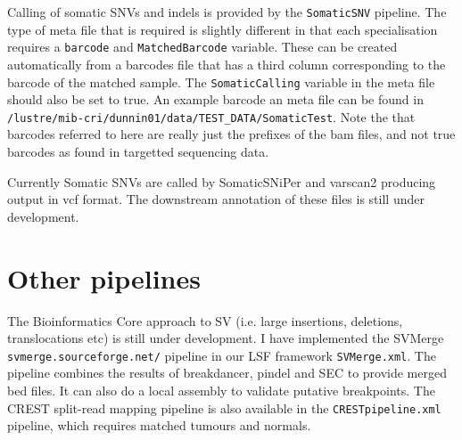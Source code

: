 \documentclass[a4paper,11pt]{article}
\begin{document}
Calling of somatic SNVs and indels is provided by the {\tt SomaticSNV} pipeline. The type of meta file that is required is slightly different in that each specialisation requires a {\tt barcode} and {\tt MatchedBarcode} variable. These can be created automatically from a barcodes file that has a third column corresponding to the barcode of the matched sample. The {\tt SomaticCalling} variable in the meta file should also be set to true. An example barcode an meta file can be found in {\tt /lustre/mib-cri/dunnin01/data/TEST\_DATA/SomaticTest}. Note the that barcodes referred to here are really just the prefixes of the bam files, and not true barcodes as found in targetted sequencing data.


Currently Somatic SNVs are called by SomaticSNiPer and varscan2 producing output in vcf format. The downstream annotation of these files is still under development.

\section{Other pipelines}

The Bioinformatics Core approach to SV (i.e. large insertions, deletions, translocations etc) is still under development. I have implemented the SVMerge {\tt svmerge.sourceforge.net/} pipeline in our LSF framework {\tt SVMerge.xml}. The pipeline combines the results of breakdancer, pindel and SEC to provide merged bed files. It can also do a local assembly to validate putative breakpoints. The CREST split-read mapping pipeline is also available in the {\tt CRESTpipeline.xml} pipeline, which requires matched tumours and normals.
\end{document}
